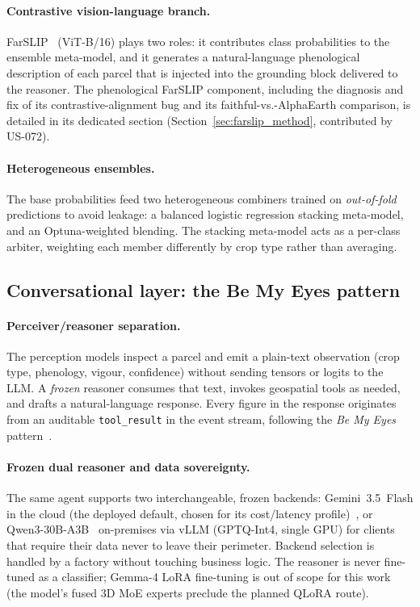 \paragraph{Contrastive vision-language branch.}
FarSLIP~\cite{li2025farslip} (ViT-B/16) plays two roles: it contributes
class probabilities to the ensemble meta-model, and it generates a
natural-language phenological description of each parcel that is
injected into the grounding block delivered to the reasoner. The
phenological FarSLIP component, including the diagnosis and fix of its
contrastive-alignment bug and its faithful-vs.-AlphaEarth comparison,
is detailed in its dedicated section (Section~\ref{sec:farslip_method},
contributed by US-072).

\paragraph{Heterogeneous ensembles.}
The base probabilities feed two heterogeneous combiners trained on
\emph{out-of-fold} predictions to avoid leakage: a balanced logistic
regression stacking meta-model, and an Optuna-weighted blending. The
stacking meta-model acts as a per-class arbiter, weighting each member
differently by crop type rather than averaging.

\subsection{Conversational layer: the Be My Eyes pattern}
\label{sec:method-bemyeyes}

\paragraph{Perceiver/reasoner separation.}
The perception models inspect a parcel and emit a plain-text observation
(crop type, phenology, vigour, confidence) without sending tensors or
logits to the LLM. A \emph{frozen} reasoner consumes that text, invokes
geospatial tools as needed, and drafts a natural-language response.
Every figure in the response originates from an auditable
\texttt{tool\_result} in the event stream, following the \emph{Be My
Eyes} pattern~\cite{huang2025bemyeyes}.

\paragraph{Frozen dual reasoner and data sovereignty.}
The same agent supports two interchangeable, frozen backends:
Gemini~3.5~Flash in the cloud (the deployed default, chosen for its
cost/latency profile)~\cite{google2025gemini25}, or
Qwen3-30B-A3B~\cite{yang2025qwen3} on-premises via vLLM
(GPTQ-Int4, single GPU) for clients that require their data never to
leave their perimeter. Backend selection is handled by a factory
without touching business logic. The reasoner is never fine-tuned as a
classifier; Gemma-4 LoRA fine-tuning is out of scope for this work
(the model's fused 3D MoE experts preclude the planned QLoRA route).


